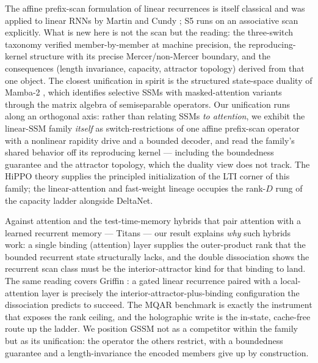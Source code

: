 \documentclass[11pt]{article}
\theoremstyle{definition}
\begin{document}
The affine prefix-scan formulation of linear recurrences is itself classical
\cite{blelloch1990prefix} and was applied to linear RNNs by Martin and Cundy
\cite{martin2018parallelizing}; S5 \cite{smith2023s5} runs on an associative scan
explicitly. What is new here is not the scan but the reading: the three-switch taxonomy
verified member-by-member at machine precision, the reproducing-kernel structure with its
precise Mercer/non-Mercer boundary, and the consequences (length invariance, capacity,
attractor topology) derived from that one object. The closest unification in spirit is the
structured state-space duality of Mamba-2 \cite{dao2024ssd}, which identifies selective SSMs with masked-attention variants through the
matrix algebra of semiseparable operators. Our unification runs along an orthogonal axis:
rather than relating SSMs \emph{to attention}, we exhibit the linear-SSM family \emph{itself}
as switch-restrictions of one affine prefix-scan operator with a nonlinear rapidity drive and
a bounded decoder, and read the family's shared behavior off its reproducing kernel ---
including the boundedness guarantee and the attractor topology, which the duality view does
not track. The HiPPO theory \cite{gu2020hippo} supplies the principled initialization of the
LTI corner of this family; the linear-attention and fast-weight lineage
\cite{katharopoulos2020linear,schlag2021fastweight} occupies the rank-$D$ rung of the
capacity ladder alongside DeltaNet.

Against attention \cite{vaswani2017attention} and the test-time-memory hybrids that pair
attention with a learned recurrent memory --- Titans \cite{behrouz2025titans} --- our result
explains \emph{why} such hybrids work: a single binding (attention) layer supplies the
outer-product rank that the bounded recurrent state structurally lacks, and the double
dissociation shows the recurrent scan class must be the interior-attractor kind for that binding
to land. The same reading covers Griffin \cite{de2024griffin}: a gated linear recurrence paired
with a local-attention layer is precisely the interior-attractor-plus-binding configuration the
dissociation predicts to succeed. The MQAR benchmark \cite{arora2024zoology} is exactly the instrument that exposes the
rank ceiling, and the holographic write \cite{plate1995holographic} is the in-state,
cache-free route up the ladder. We position GSSM not as a competitor within the family but as
its unification: the operator the others restrict, with a boundedness guarantee and a
length-invariance the encoded members give up by construction.
\end{document}
